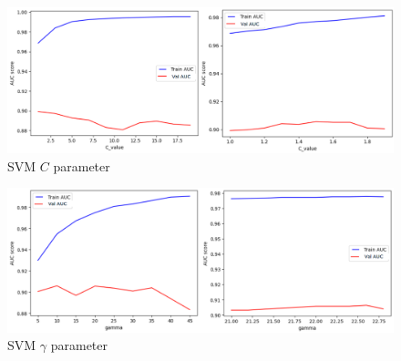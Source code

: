 \documentclass[12pt]{article}
\begin{document}
\begin{figure}[ht!]
  \begin{center}
    \includegraphics[scale=0.5]{"./Diagrams/c_graph.PNG"}
    \caption{SVM $C$ parameter}
    \label{figure:2}
  \end{center}
\end{figure}

\begin{figure}[ht!]
  \begin{center}
    \includegraphics[scale=0.5]{"./Diagrams/gamma_graph.PNG"}
    \caption{SVM $\gamma$ parameter}
    \label{figure:3}
  \end{center}
\end{figure}

\pagebreak



\end{document}
